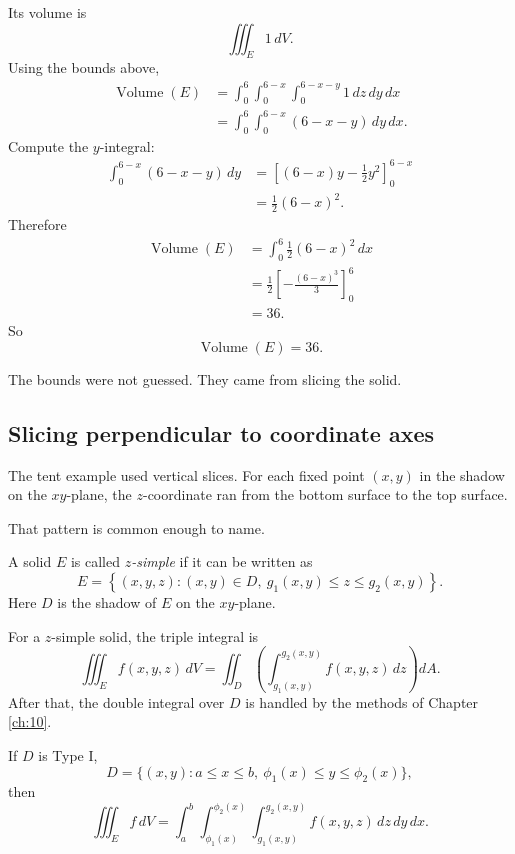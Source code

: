 Its volume is
\[
    \iiint_E 1\,dV.
\]
Using the bounds above,
\[
\begin{aligned}
\operatorname{Volume}(E)
&=
\int_0^6\int_0^{6-x}\int_0^{6-x-y} 1\,dz\,dy\,dx\\
&=
\int_0^6\int_0^{6-x} (6-x-y)\,dy\,dx.
\end{aligned}
\]
Compute the \(y\)-integral:
\[
\begin{aligned}
\int_0^{6-x} (6-x-y)\,dy
&=
\left[
(6-x)y-\frac12y^2
\right]_0^{6-x}\\
&=
\frac12(6-x)^2.
\end{aligned}
\]
Therefore
\[
\begin{aligned}
\operatorname{Volume}(E)
&=
\int_0^6 \frac12(6-x)^2\,dx\\
&=
\frac12\left[-\frac{(6-x)^3}{3}\right]_0^6\\
&=
36.
\end{aligned}
\]
So
\[
\boxed{
    \operatorname{Volume}(E)=36.
}
\]

The bounds were not guessed.  They came from slicing the solid.

\subsection{Slicing perpendicular to coordinate axes}

The tent example used vertical slices.  For each fixed point \((x,y)\) in the shadow on
the \(xy\)-plane, the \(z\)-coordinate ran from the bottom surface to the top surface.

That pattern is common enough to name.

\begin{definition}
A solid \(E\) is called \emph{\(z\)-simple} if it can be written as
\[
\boxed{
    E=
    \left\{
    (x,y,z):
    (x,y)\in D,\ 
    g_1(x,y)\le z\le g_2(x,y)
    \right\}.
}
\]
Here \(D\) is the shadow of \(E\) on the \(xy\)-plane.
\end{definition}

For a \(z\)-simple solid, the triple integral is
\[
\boxed{
    \iiint_E f(x,y,z)\,dV
    =
    \iint_D
    \left(
        \int_{g_1(x,y)}^{g_2(x,y)}
        f(x,y,z)\,dz
    \right)dA.
}
\]
After that, the double integral over \(D\) is handled by the methods of Chapter
\ref{ch:10}.

If \(D\) is Type I,
\[
    D=\{(x,y):a\le x\le b,\ \phi_1(x)\le y\le \phi_2(x)\},
\]
then
\[
\boxed{
    \iiint_E f\,dV
    =
    \int_a^b
    \int_{\phi_1(x)}^{\phi_2(x)}
    \int_{g_1(x,y)}^{g_2(x,y)}
    f(x,y,z)\,dz\,dy\,dx.
}
\]

